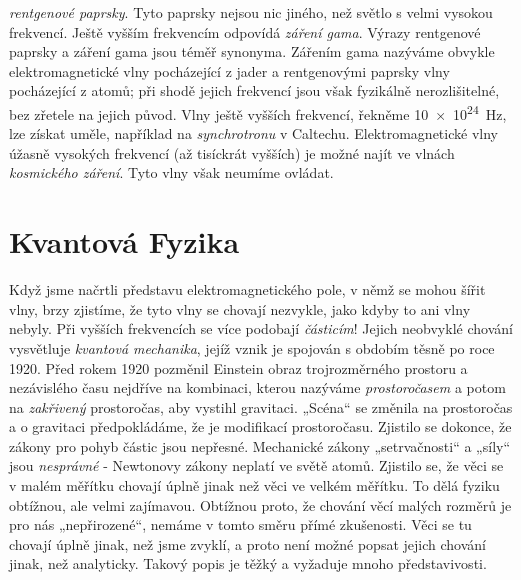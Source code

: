 {    \emph{rentgenové paprsky}. Tyto paprsky nejsou nic jiného, než světlo s velmi vysokou 
    frekvencí. Ještě vyšším frekvencím odpovídá \emph{záření gama}. Výrazy rentgenové paprsky a 
    záření gama jsou téměř synonyma. Zářením gama nazýváme obvykle elektromagnetické vlny 
    pocházející z jader a rentgenovými paprsky vlny pocházející z atomů; při shodě jejich frekvencí 
    jsou však fyzikálně nerozlišitelné, bez zřetele na jejich původ. Vlny ještě vyšších 
    frekvencí, řekněme \SI{10e24}{\Hz}, lze získat uměle, například na \emph{synchrotronu} v 
    Caltechu. Elektromagnetické vlny úžasně vysokých frekvencí (až tisíckrát vyšších) je možné 
    najít ve vlnách \emph{kosmického záření}. Tyto vlny však neumíme ovládat. 
    \cite[s.~29]{Feynman02}
  
  \section{Kvantová Fyzika}\label{fyz:IchapIsecV}
    Když jsme načrtli představu elektromagnetického pole, v němž se mohou šířit vlny, brzy 
    zjistíme, že tyto vlny se chovají nezvykle, jako kdyby to ani vlny nebyly. Při vyšších 
    frekvencích se více podobají \emph{částicím}! Jejich neobvyklé chování vysvětluje 
    \emph{kvantová mechanika}, jejíž vznik je spojován s obdobím těsně po roce 1920. Před rokem 
    1920 pozměnil Einstein obraz trojrozměrného prostoru a nezávislého času nejdříve na kombinaci, 
    kterou nazýváme \emph{prostoročasem} a potom na \emph{zakřivený} prostoročas, aby vystihl 
    gravitaci. „Scéna“ se změnila na prostoročas a o gravitaci předpokládáme, že je modifikací 
    prostoročasu. Zjistilo se dokonce, že zákony pro pohyb částic jsou nepřesné. Mechanické zákony 
    „setrvačnosti“ a „síly“ jsou \emph{nesprávné} - Newtonovy zákony neplatí ve světě atomů. 
    Zjistilo se, že věci se v malém měřítku chovají úplně jinak než věci ve velkém měřítku. To dělá 
    fyziku obtížnou, ale velmi zajímavou. Obtížnou proto, že chování věcí malých rozměrů je pro nás 
    „nepřirozené“, nemáme v tomto směru přímé zkušenosti. Věci se tu chovají úplně jinak, než jsme 
    zvyklí, a proto není možné popsat jejich chování jinak, než analyticky. Takový popis je těžký a 
    vyžaduje mnoho představivosti.
    
}
